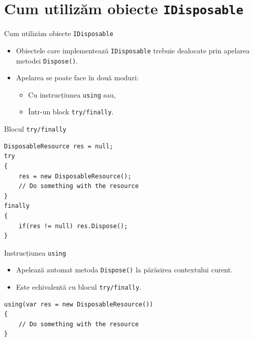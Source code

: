 \documentclass[presentation]{beamer}
\begin{document}
\section{Cum utilizăm obiecte \texttt{IDisposable}}
\label{sec:org9ee3eee}
\begin{frame}[label={sec:org0d84841},fragile]{Cum utilizăm obiecte \texttt{IDisposable}}
 \begin{itemize}
\item Obiectele care implementează \texttt{IDisposable} trebuie dealocate prin apelarea metodei \texttt{Dispose()}.
\item Apelarea se poate face în două moduri:
\begin{itemize}
\item Cu instrucțiunea \texttt{using} sau,
\item Într-un block \texttt{try/finally}.
\end{itemize}
\end{itemize}
\end{frame}
\begin{frame}[label={sec:orgc7c1822},fragile]{Blocul \texttt{try/finally}}
 \begin{verbatim}
DisposableResource res = null;
try
{
    res = new DisposableResource();
    // Do something with the resource
}
finally
{
    if(res != null) res.Dispose();
}
\end{verbatim}
\end{frame}
\begin{frame}[label={sec:org58e4ebf},fragile]{Instrucțiunea \texttt{using}}
 \begin{itemize}
\item Apelează automat metoda \texttt{Dispose()} la părăsirea contextului curent.
\item Este echivalentă cu blocul \texttt{try/finally}.
\end{itemize}
\vskip 0.3in
\begin{verbatim}
using(var res = new DisposableResource())
{
    // Do something with the resource
}
\end{verbatim}
\end{frame}
\end{document}
